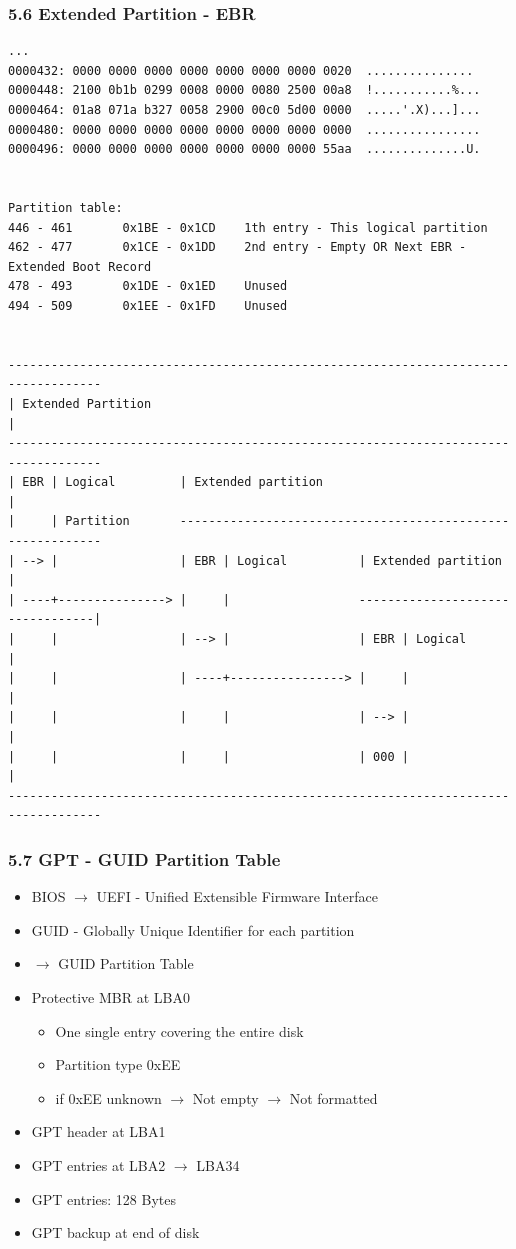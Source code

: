\begin{frame}[fragile]
  \frametitle{5.6 Extended Partition - EBR}
  \begin{lstlisting}[basicstyle=\tiny]
...
0000432: 0000 0000 0000 0000 0000 0000 0000 0020  ............... 
0000448: 2100 0b1b 0299 0008 0000 0080 2500 00a8  !...........%...
0000464: 01a8 071a b327 0058 2900 00c0 5d00 0000  .....'.X)...]...
0000480: 0000 0000 0000 0000 0000 0000 0000 0000  ................
0000496: 0000 0000 0000 0000 0000 0000 0000 55aa  ..............U.


Partition table:
446 - 461       0x1BE - 0x1CD    1th entry - This logical partition
462 - 477       0x1CE - 0x1DD    2nd entry - Empty OR Next EBR - Extended Boot Record
478 - 493       0x1DE - 0x1ED    Unused
494 - 509       0x1EE - 0x1FD    Unused


-----------------------------------------------------------------------------------
| Extended Partition                                                              |
-----------------------------------------------------------------------------------
| EBR | Logical         | Extended partition                                      |
|     | Partition       -----------------------------------------------------------
| --> |                 | EBR | Logical          | Extended partition             |
| ----+---------------> |     |                  ---------------------------------|
|     |                 | --> |                  | EBR | Logical                  |
|     |                 | ----+----------------> |     |                          |
|     |                 |     |                  | --> |                          |
|     |                 |     |                  | 000 |                          |
-----------------------------------------------------------------------------------
  \end{lstlisting}
\end{frame}


\begin{frame}[fragile]
  \frametitle{5.7 GPT - GUID Partition Table}
    \begin{itemize}
        \item BIOS $\to$ UEFI - Unified Extensible Firmware Interface
	\item GUID - Globally Unique Identifier for each partition
	\item[] $\to$ GUID Partition Table
	\item Protective MBR at LBA0
        \begin{itemize}
            \item One single entry covering the entire disk
            \item Partition type 0xEE
	    \item[] if 0xEE unknown $\to$ Not empty $\to$ Not formatted
        \end{itemize}
	\item GPT header at LBA1
	\item GPT entries at LBA2 $\to$ LBA34
	\item GPT entries: 128 Bytes
	\item GPT backup at end of disk
    \end{itemize}
\end{frame}



